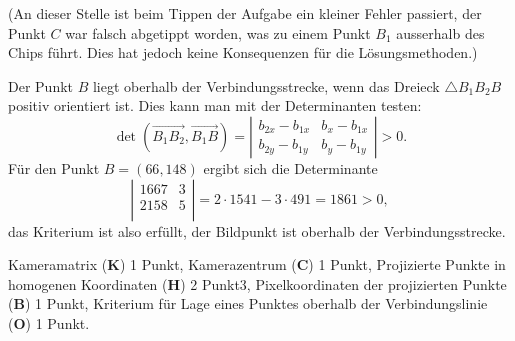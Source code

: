 \begin{loesung}
\begin{teilaufgaben}
(An dieser Stelle ist beim Tippen der Aufgabe ein kleiner Fehler
passiert, der Punkt $C$ war falsch abgetippt worden, was zu einem Punkt $B_1$
ausserhalb des Chips führt. Dies hat jedoch keine Konsequenzen für
die Lösungsmethoden.)
\item
Der Punkt $B$ liegt oberhalb der Verbindungsstrecke, wenn das Dreieck
$\triangle B_1B_2B$ positiv orientiert ist. 
Dies kann man mit der Determinanten testen:
\[
\det(\overrightarrow{B_1B_2},\overrightarrow{B_1B})
=
\left|
\begin{matrix}
b_{2x}-b_{1x}&b_x-b_{1x}\\
b_{2y}-b_{1y}&b_y-b_{1y}
\end{matrix}
\right|
> 0.
\]
Für den Punkt $B=(66,148)$ ergibt sich die Determinante
\[
\left|
\begin{matrix}
1667& 3\\
2158& 5\\
\end{matrix}
\right|
=
2\cdot 1541 - 3\cdot 491 
=
1861 > 0,
\]
das Kriterium ist also erfüllt, der Bildpunkt ist oberhalb der
Verbindungsstrecke.
\qedhere
\end{teilaufgaben}
\end{loesung}

\begin{bewertung}
Kameramatrix ({\bf K}) 1 Punkt,
Kamerazentrum ({\bf C}) 1 Punkt,
Projizierte Punkte in homogenen Koordinaten ({\bf H}) 2 Punkt3,
Pixelkoordinaten der projizierten Punkte ({\bf B}) 1 Punkt,
Kriterium für Lage eines Punktes oberhalb der Verbindungslinie 
({\bf O}) 1 Punkt.
\end{bewertung}



